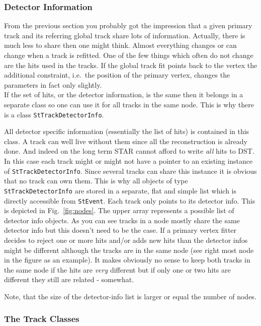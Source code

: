 \documentclass[twoside]{article}
\begin{document}
\subsubsection{Detector Information}
\label{sec:detInfo}
From the previous section you probably got the impression that a given
primary track and its referring global track share lots of
information.  Actually, there is much less to share then one might
think.  Almost everything changes or can change when a track is
refitted. One of the few things which often do not change are the hits
used in the tracks.  If the global track fit points back to the vertex
the additional constraint, i.e.~the position of the primary
vertex, changes the parameters in fact only slightly. \\
If the set of hits, or the detector information, is the same then it
belongs in a separate class so one can use it for all tracks in the
same node.  This is why there is a class \texttt{StTrackDetectorInfo}.
 
All detector specific information (essentially the list of hits) is
contained in this class.  A track can well live without them since all
the reconstruction is already done.  And indeed on the long term STAR
cannot afford to write \emph{all} hits to DST. In this case each track
might or might not have a pointer to an existing instance of
\texttt{StTrackDetectorInfo}.  Since several tracks can share this
instance it is obvious that no track can own them. This is why all
objects of type \texttt{StTrackDetectorInfo} are stored in a separate,
flat and simple list which is directly accessible from
\texttt{StEvent}. Each track only points to its detector info. This is
depicted in Fig.~\ref{fig:nodes}.  The upper array represents a
possible list of detector info objects.  As you can see tracks in a
node mostly share the same detector info but this doesn't need to be
the case. If a primary vertex fitter decides to reject one or more
hits and/or adds new hits than the detector infos might be different
although the tracks are in the same node (see right most node in the
figure as an example). It makes obviously no sense to keep both tracks
in the same node if the hits are \emph{very} different but if only one
or two hits are different they still are related - somewhat.

Note, that the size of the detector-info list is larger or equal the
number of nodes.

\subsubsection{The Track Classes}
\end{document}
